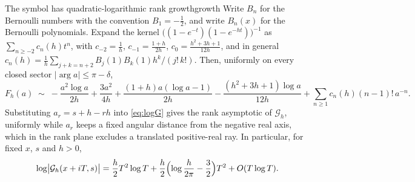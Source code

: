 \documentclass[11pt,letterpaper]{article}
\newcommand{\Gc}{\mathcal{G}}               %
\newcommand{\Fh}{F_h}
\begin{document}
\begin{proposition}{The symbol has quadratic-logarithmic rank growth}{growth}
Write $B_n$ for the Bernoulli numbers with the convention $B_1=-\tfrac12$, and
write $B_n(x)$ for the Bernoulli polynomials. Expand the kernel
$\bigl((1-e^{-t})(1-e^{-ht})\bigr)^{-1}$ as $\sum_{n\ge-2}c_n(h)t^n$,
with $c_{-2}=\tfrac1h$, $c_{-1}=\tfrac{1+h}{2h}$, $c_0=\tfrac{h^2+3h+1}{12h}$,
and in general $c_n(h)=\tfrac1h\sum_{j+k=n+2}B_j(1)B_k(1)h^k/(j!\,k!)$. Then,
uniformly on every closed sector $\lvert\arg a\rvert\le\pi-\delta$,
\begin{equation}
  \Fh(a)\;\sim\;-\frac{a^{2}\log a}{2h}+\frac{3a^{2}}{4h}
  +\frac{(1+h)a(\log a-1)}{2h}-\frac{(h^{2}+3h+1)\log a}{12h}
  +\sum_{n\ge1}c_n(h)(n-1)!\,a^{-n}.
  \label{eq:stirling}
\end{equation}
Substituting $a_r=s+h-rh$ into \eqref{eq:logG} gives the rank asymptotic of
$\Gc_h$, uniformly while $a_r$ keeps a fixed angular distance from the negative
real axis, which in the rank plane excludes a translated positive-real ray. In
particular, for fixed $x$, $s$ and $h>0$,
\begin{equation}
  \log\bigl|\Gc_h(x+iT,s)\bigr|
  =\frac{h}{2}T^{2}\log T
  +\frac{h}{2}\Bigl(\log\frac{h}{2\pi}-\frac32\Bigr)T^{2}
  +O(T\log T).
  \label{eq:vertical}
\end{equation}
\end{proposition}
\end{document}
